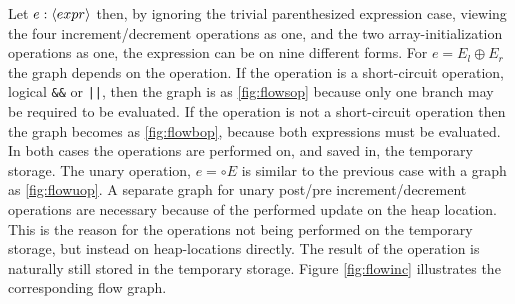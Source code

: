 Let $e : \langle expr\rangle$ then, by ignoring the trivial parenthesized expression case, viewing the four increment/decrement operations as one, and the two array-initialization operations as one, the expression can be on nine different forms. For $e = E_l \oplus E_r$ the graph depends on the operation. If the operation is a short-circuit operation, logical \texttt{\&\&} or \texttt{||}, then the graph is as \ref{fig:flowsop} because only one branch may be required to be evaluated. If the operation is not a short-circuit operation then the graph becomes as \ref{fig:flowbop}, because both expressions must be evaluated. In both cases the operations are performed on, and saved in, the temporary storage. The unary operation, $e = \circ E$ is similar to the previous case with a graph as \ref{fig:flowuop}. A separate graph for unary post/pre increment/decrement operations are necessary because of the performed update on the heap location. This is the reason for the operations not being performed on the temporary storage, but instead on heap-locations directly. The result of the operation is naturally still stored in the temporary storage. Figure \ref{fig:flowinc} illustrates the corresponding flow graph.
